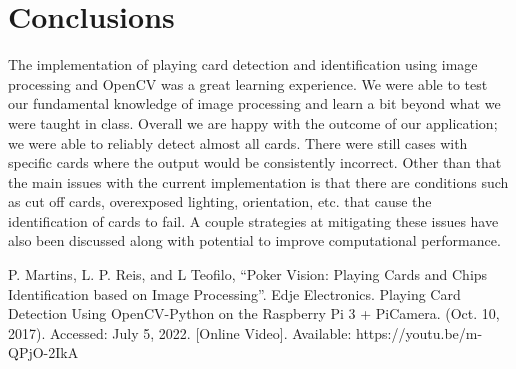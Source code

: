 \documentclass[conference]{IEEEtran}
\begin{document}
\section{Conclusions}
The implementation of playing card detection and identification using image processing and OpenCV
was a great learning experience. We were able to test our fundamental knowledge of image processing
and learn a bit beyond what we were taught in class. Overall we are happy with the outcome of our
application; we were able to reliably detect almost all cards. There were still cases with specific
cards where the output would be consistently incorrect. Other than that the main issues with the
current implementation is that there are conditions such as cut off cards, overexposed lighting,
orientation, etc. that cause the identification of cards to fail. A couple strategies at mitigating
these issues have also been discussed along with potential to improve computational performance.

\begin{thebibliography}{00}
 P. Martins, L. P. Reis, and L Teofilo, ``Poker Vision: Playing Cards and
    Chips Identification based on Image Processing''.
 Edje Electronics. Playing Card Detection Using OpenCV-Python on the Raspberry Pi 3 + PiCamera. (Oct. 10, 2017). Accessed: July 5, 2022. [Online Video]. Available: https://youtu.be/m-QPjO-2IkA
\end{thebibliography}
\vspace{12pt}
\end{document}
